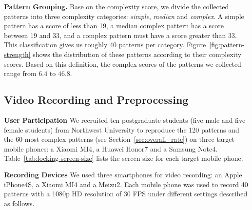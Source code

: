 
    \vspace{2mm}
    \noindent \textbf{Pattern Grouping.}
    Base on the complexity score, we divide the collected patterns into three complexity categories: \emph{simple}, \emph{median} and \emph{complex}. A simple pattern has a score of less than 19,
    a median
    complex pattern has a score between 19 and 33, and a complex pattern must have a score greater than 33. This classification gives us roughly 40 patterns per
    category.
    Figure~\ref{fig:pattern-strength} shows the distribution of these patterns according to their complexity scores.
    Based on this definition, 
    the complex scores of the patterns we collected range from $6.4$ to $46.8$.

    \vspace{-3mm}
    \subsection{Video Recording and Preprocessing}

    \noindent\textbf{User Participation} We recruited ten postgraduate students (five male and five female
    students) from Northwest University to reproduce the 120 patterns
    and the 60 most complex patterns (see Section~\ref{sec:overall_rate})  on three target mobile phones:
    a Xiaomi MI4, a Huawei Honor7 and a Samsung Note4. Table~\ref{tab:locking-screen-size} lists
    the screen size for each target mobile phone.

    \vspace{2mm}
    \noindent\textbf{Recording Devices} We used three smartphones for video recording: an Apple iPhone4S,
     a Xiaomi MI4 and a Meizu2. Each mobile phone was used to record 40 patterns with a
    1080p HD resolution of 30 FPS under different settings described as follows.

